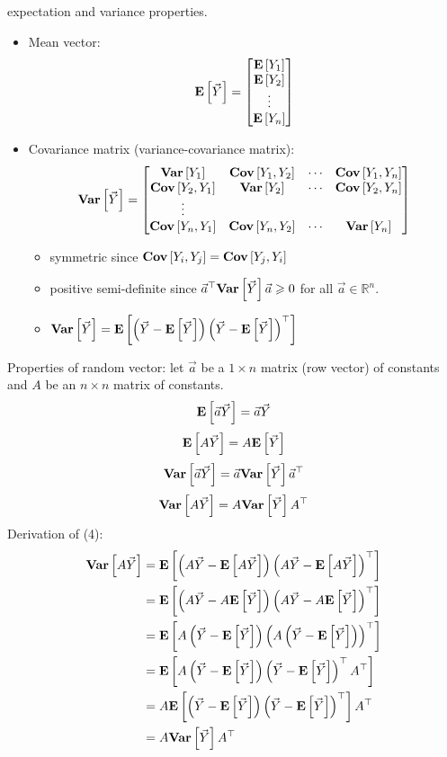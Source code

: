 expectation and variance properties.
\begin{itemize}
    \item Mean vector:
          \[ \bm{\mathrm{E}}\left[\vec{Y}\right]=\begin{bmatrix}
                  \bm{\mathrm{E}}\left[Y_1\right] \\
                  \bm{\mathrm{E}}\left[Y_2\right] \\
                  \vdots  \\
                  \bm{\mathrm{E}}\left[Y_n\right]
              \end{bmatrix} \]
    \item Covariance matrix (variance-covariance matrix):
          \[ \bm{\mathrm{Var}}\left[\vec{Y}\right]=\begin{bmatrix}
                  \bm{\mathrm{Var}}\left[Y_1\right]     & \bm{\mathrm{Cov}}\left[Y_1,Y_2\right] & \cdots & \bm{\mathrm{Cov}}\left[Y_1,Y_n\right] \\
                  \bm{\mathrm{Cov}}\left[Y_2,Y_1\right] & \bm{\mathrm{Var}}\left[Y_2\right]     & \cdots & \bm{\mathrm{Cov}}\left[Y_2,Y_n\right] \\
                  \vdots                                                 \\
                  \bm{\mathrm{Cov}}\left[Y_n,Y_1\right] & \bm{\mathrm{Cov}}\left[Y_n,Y_2\right] & \cdots & \bm{\mathrm{Var}}\left[Y_n\right]
              \end{bmatrix} \]
          \begin{itemize}
              \item symmetric since $ \bm{\mathrm{Cov}}\left[Y_i,Y_j\right]=\bm{\mathrm{Cov}}\left[Y_j,Y_i\right] $
              \item positive semi-definite since
                    $ \vec{a}^\top\bm{\mathrm{Var}}\left[\vec{Y}\right]\vec{a}\geqslant 0 $
                    for all $ \vec{a}\in\mathbb{R}^n $.
              \item $ \bm{\mathrm{Var}}\left[\vec{Y}\right]=
                        \bm{\mathrm{E}}\left[\left( \vec{Y}-\bm{\mathrm{E}}\left[\vec{Y}\right] \right)\left( \vec{Y}-\bm{\mathrm{E}}\left[\vec{Y}\right] \right)^\top\right] $
          \end{itemize}
\end{itemize}
Properties of random vector: let $ \vec{a} $ be a $ 1\times n $
matrix (row vector) of constants and $ A $ be an $ n\times n $
matrix of constants.
\[ \bm{\mathrm{E}}\left[\vec{a}\vec{Y}\right]=\vec{a}\vec{Y} \]
\[ \bm{\mathrm{E}}\left[A\vec{Y}\right]=A\bm{\mathrm{E}}\left[\vec{Y}\right] \]
\[ \bm{\mathrm{Var}}\left[\vec{a}\vec{Y}\right]=\vec{a}\bm{\mathrm{Var}}\left[\vec{Y}\right]\vec{a}^\top \]
\[ \bm{\mathrm{Var}}\left[A\vec{Y}\right]=A\bm{\mathrm{Var}}\left[\vec{Y}\right]A^\top \]
Derivation of (4):
\begin{align*}
    \bm{\mathrm{Var}}\left[A\vec{Y}\right]
     & =\bm{\mathrm{E}}\left[\left(A\vec{Y}-\bm{\mathrm{E}}\left[A\vec{Y}\right]\right)
        \left(A\vec{Y}-\bm{\mathrm{E}}\left[A\vec{Y}\right]\right)^\top\right]                                             \\
     & =\bm{\mathrm{E}}\left[\left( A\vec{Y}-A\bm{\mathrm{E}}\left[\vec{Y}\right] \right)
        \left( A\vec{Y}-A\bm{\mathrm{E}}\left[\vec{Y}\right] \right)^\top\right]                                           \\
     & =\bm{\mathrm{E}}\left[A\left( \vec{Y}-\bm{\mathrm{E}}\left[\vec{Y}\right] \right)
        \left( A\left( \vec{Y}-\bm{\mathrm{E}}\left[\vec{Y}\right] \right) \right)^\top\right]                             \\
     & =\bm{\mathrm{E}}\left[A\left( \vec{Y}-\bm{\mathrm{E}}\left[\vec{Y}\right] \right)
        \left( \vec{Y}-\bm{\mathrm{E}}\left[\vec{Y}\right] \right)^\top A^\top\right]                                      \\
     & =A\bm{\mathrm{E}}\left[\left( \vec{Y}-\bm{\mathrm{E}}\left[\vec{Y}\right] \right)\left( \vec{Y}-\bm{\mathrm{E}}\left[\vec{Y}\right] \right)^\top\right]A^\top \\
     & =A\bm{\mathrm{Var}}\left[\vec{Y}\right]A^\top
\end{align*}
